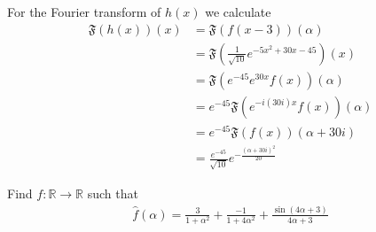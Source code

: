 \documentclass[11pt]{article}
\begin{document}
\begin{solution}
For the Fourier transform of $h(x)$ we calculate 
\begin{align*}
    \mathfrak{F}(h(x))(x) & =\mathfrak{F}(f(x-3))(\alpha) \\ & =\mathfrak{F}\left(\frac{1}{\sqrt{10}} e^{-5 x^2+30 x-45}\right)(x) \\ & =\mathfrak{F}\left(e^{-45} e^{30 x} f(x)\right)(\alpha) \\ & =e^{-45} \mathfrak{F}\left(e^{-i(30 i) x} f(x)\right)(\alpha) \\ & =e^{-45} \mathfrak{F}(f(x))(\alpha+30 i) \\ & =\frac{e^{-45}}{\sqrt{10}} e^{-\frac{(\alpha+30 i)^2}{20}}
\end{align*}
\end{solution}

\begin{exercise}
    Find $f : \mathbb R \to \mathbb R$ such that 
    \begin{align*}
        \hat f(\alpha) = \frac{3}{1+\alpha^{2}} + \frac{-1}{1+4\alpha^{2}} + \frac{ \sin( 4 \alpha + 3 ) }{ 4 \alpha + 3 }
    \end{align*}
\end{exercise}
\end{document}
